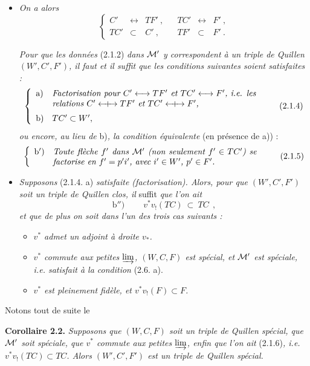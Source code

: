 \begin{itemize}
\item[1°)] \textit{On a alors}
\[
\left\{
\begin{array}{rclcrcl}
C' & \longleftrightarrow & TF'\ , & & TC' & \longleftrightarrow & F'\ ,\\
TC' & \subset & C'\ , & & TF' & \subset & F'\ .
\end{array}\right.
\tag*{(2.1.3)}
\]

\textit{Pour que les données} (2.1.2) \textit{dans $\mathcal{M}'$ y correspondent à un triple de Quillen $(W',C',F')$, il faut et il suffit que les conditions suivantes soient satisfaites :}
\[
\left\{
\begin{array}{ll}
\text{a)} & \parbox[t]{0.7\textwidth}{\textit{Factorisation pour $C' \longleftrightarrow TF'$ et $TC' \longleftrightarrow F'$, i.e. les relations $C' \Qcouple TF'$ et $TC' \Qcouple F'$,}}\\[4ex]
\text{b)} & TC' \subset W',
\end{array}\right. %
\tag*{(2.1.4)}
\]
\textit{ou encore, au lieu de} b)\textit{, la condition équivalente} (en présence de a)) :
\[
\left\{
\begin{array}{ll}
\text{b$'$)} & \parbox[t]{0.7\textwidth}{\textit{Toute flèche $f'$ dans $\M'$ (non seulement $f' \in TC'$) se factorise en $f' = p'i'$, avec $i' \in W'$, $p' \in F'$.}}
\end{array}\right.
\tag*{(2.1.5)}
\]
\item[2°)] \textit{Supposons} (2.1.4. a) \textit{satisfaite (factorisation). Alors, pour que $(W',C',F')$ soit un triple de Quillen clos, il} suffit \textit{que l'on ait}
\[
\text{b$''$)}\qquad \boxed{\ v^*v_!(TC)\ \subset\ TC\ }\ ,
\tag*{(2.1.6)}
\]
\textit{et que de plus on soit dans l'un des trois cas suivants :}
\begin{itemize}
\item[A)] \textit{$v^*$ admet un adjoint à droite $v_*$.}
\item[B)] \textit{$v^*$ commute aux petites} $\varinjlim$\textit{, $(W,C,F)$ est spécial, et $\mathcal{M}'$ est spéciale, i.e. satisfait à la condition} (2.6. a).
\item[C)] \textit{$v^*$ est pleinement fidèle, et $v^*v_!(F) \subset F$.}
\end{itemize}
\end{itemize}
Notons tout de suite le

\textbf{Corollaire 2.2.} \textit{Supposons que $(W,C,F)$ soit un triple de Quillen spécial, que $\mathcal{M}'$ soit spéciale, que $v^*$ commute aux petites} $\varinjlim$\textit{, enfin que l'on ait} (2.1.6)\textit{, i.e. $v^*v_!(TC) \subset TC$. Alors $(W',C',F')$ est un triple de Quillen spécial.}

